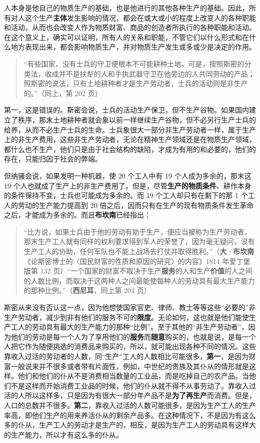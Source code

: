 人本身是他自己的物质生产的基础，也是他进行的其他各种生产的基础。因此，所有对人这个生产\textbf{主体}发生影响的情况，都会在或大或小的程度上改变人的各种职能和活动，从而也会改变人作为物质财富、商品的创造者所执行的各种职能和活动。在这个意义上，确实可以证明，所有人的关系和职能，不管它们以什么形式和在什么地方表现出来，都会影响物质生产，并对物质生产发生或多或少是决定的作用。

\begin{quote}“有些国家，没有士兵的守卫便根本不可能耕种土地。可是，按照斯密的分类法，收成并不是扶犁的人和手执武器守卫在他旁边的人共同劳动的产品；照斯密的说法，只有土地耕种者才是生产劳动者，士兵的活动则是非生产的。”（同上，第 202 页）\end{quote}

第一，这是错误的。斯密会说，士兵的活动生产保卫，但不生产谷物。如果国内建立了秩序，那末土地耕种者就会象以前一样继续生产谷物，但不必另行生产士兵的给养，从而不必生产士兵的生命。士兵象很大一部分非生产劳动者一样，属于生产上的非生产费用，这些非生产劳动者，无论在精神生产领域还是在物质生产领域，都什么也不生产，他们只是由于社会结构的缺陷，才成为有用的和必要的，他们的存在，只能归因于社会的弊端。

但纳骚会说，如果发明一种机器，使 20 个工人中有 19 个人成为多余的，那末这 19 个人也就成了生产上的非生产费用了。但是，尽管\textbf{生产的物质条件}、耕作本身的条件保持不变，士兵也可能成为多余的。而 19 个工人却只有在剩下的那 1 个工人的劳动的生产能力提高到 20 倍之后，因而只有在生产的现有物质条件发生革命之后，才能成为多余的。而且\textbf{布坎南}已经指出：

\begin{quote}“比方说，如果士兵由于他的劳动有助于生产，便应当被称为生产劳动者，那末生产工人就有同样的权利要求得到军人的荣誉了，因为毫无疑问，没有生产工人的协助，任何军队也不能上战场去打仗并取得胜利。”（\textbf{大·布坎南}《论斯密博士的〈国民财富的性质和原因的研究〉的内容》1814 年爱丁堡版第 132 页）“一个国家的财富不取决于生产\textbf{服务}的人和生产\textbf{价值}的人之间的人数比例，而取决于这两种人之间最能使每种人的劳动具有最大生产能力的那种比例。”（\textbf{西尼耳}，同上第 204 页）\end{quote}

斯密从来没有否认这一点，因为他想使国家官吏、律师、教士等等这些“必要的”非生产劳动者，减少到非有他们的服务不可的\textbf{限度}。无论如何，这也就是他们能使生产工人的劳动具有最大的生产能力的那种“比例”。至于其他的“非生产劳动者”，因为他们的劳动是每一个人为了享用他们的\textbf{服务}而\textbf{随意}购买的，也就是说，是每一个人把它作为随便挑选的消费品来购买的，所以，就可能出现各种不同的情况。这些靠收入过活的劳动者的人数，同“生产”工人的人数相比可能很多，\textbf{第一}，是因为财富一般说来并不很多或者带有片面性，例如，中世纪的贵族及其仆从的情形就是这样。他们和他们的仆从不是消费相当数量的工业品，而是吃掉自己的农产品。当他们不是这样而开始消费工业品的时候，他们的仆从就不得不从事劳动了。靠收入过活的人所以这样多，只是因为有很大一部分年产品不是\textbf{为了再生产}而消费。但是，人口的总数并不很多。\textbf{第二}，靠收入过活的人数可能很多，是因为生产工人的生产率高，即他们生产的用来养活仆从的剩余产品多。在这种情况下，不是因为有这么多的仆从，生产工人的劳动才是生产的，相反，是因为生产工人的劳动具有这样大的生产能力，所以才有这么多的仆从。

